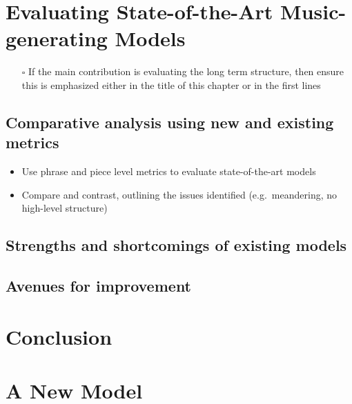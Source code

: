 \documentclass[12pt,a4paper,]{report}
\providecommand{\tightlist}{%
  \setlength{\itemsep}{0pt}\setlength{\parskip}{0pt}}
\begin{document}
\hypertarget{evaluating-state-of-the-art-music-generating-models}{%
\chapter{Evaluating State-of-the-Art Music-generating
Models}\label{evaluating-state-of-the-art-music-generating-models}}

\begin{itemize}
\tightlist
\item[$\square$]
  If the main contribution is evaluating the long term structure, then
  ensure this is emphasized either in the title of this chapter or in
  the first lines
\end{itemize}

\hypertarget{comparative-analysis-using-new-and-existing-metrics}{%
\section{Comparative analysis using new and existing
metrics}\label{comparative-analysis-using-new-and-existing-metrics}}

\begin{itemize}
\tightlist
\item
  Use phrase and piece level metrics to evaluate state-of-the-art models
\item
  Compare and contrast, outlining the issues identified
  (e.g.~meandering, no high-level structure)
\end{itemize}

\hypertarget{strengths-and-shortcomings-of-existing-models}{%
\section{Strengths and shortcomings of existing
models}\label{strengths-and-shortcomings-of-existing-models}}

\hypertarget{avenues-for-improvement}{%
\section{Avenues for improvement}\label{avenues-for-improvement}}

\hypertarget{conclusion}{%
\chapter{Conclusion}\label{conclusion}}

\hypertarget{a-new-model}{%
\chapter{A New Model}\label{a-new-model}}
\end{document}
